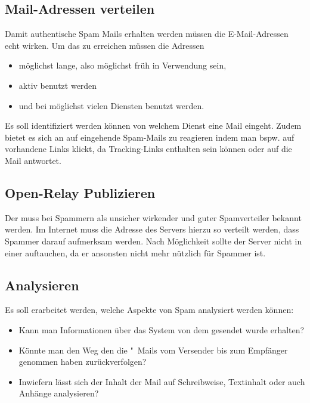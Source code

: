 \documentclass[a4paper,11pt,singlespacing]{article}
\begin{document}
	\subsection{Mail-Adressen verteilen}\label{sec:ProblemstellungMailsVerteilen}
		Damit authentische Spam Mails erhalten werden müssen die E-Mail-Adressen echt wirken.
		Um das zu erreichen müssen die Adressen
		\begin{itemize}
		\item möglichst lange, also möglichst früh in Verwendung sein,
		\item aktiv benutzt werden
		\item und bei möglichst vielen Diensten benutzt werden.
		\end{itemize}
		Es soll identifiziert werden können von welchem Dienst eine Mail eingeht.
		Zudem bietet es sich an auf eingehende Spam-Mails zu reagieren indem man bspw. auf vorhandene Links klickt, da Tracking-Links enthalten sein können oder auf die Mail antwortet. %

	\subsection{Open-Relay Publizieren}\label{sec:ProblemstellungPublizieren}
		Der  muss bei Spammern als unsicher wirkender  und guter Spamverteiler bekannt werden.
		Im Internet muss die Adresse des Servers hierzu so verteilt werden, dass Spammer darauf aufmerksam werden.
		Nach Möglichkeit sollte der Server nicht in einer   auftauchen, da er ansonsten nicht mehr nützlich für Spammer ist.

	\subsection{Analysieren}\label{sec:ProblemstellungAnalysieren}
		Es soll erarbeitet werden, welche Aspekte von Spam analysiert werden können:
		\begin{itemize}
		\item Kann man Informationen über das System von dem gesendet wurde erhalten?
		\item Könnte man den Weg den die "~Mails vom Versender bis zum Empfänger genommen haben zurückverfolgen?
		\item Inwiefern lässt sich der Inhalt der Mail auf Schreibweise, Textinhalt oder auch Anhänge analysieren?
		\end{itemize}
\end{document}
